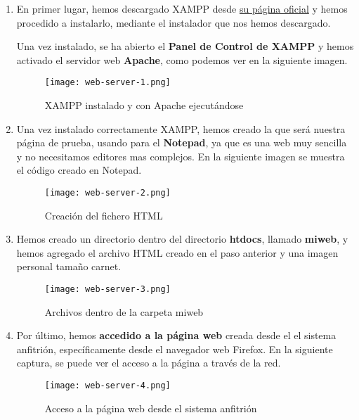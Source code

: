\begin{enumerate}
    \item En primer lugar, hemos descargado XAMPP desde \href{https://www.apachefriends.org/es/index.html}{su página oficial} y hemos procedido a instalarlo, mediante el instalador que nos hemos descargado.

    Una vez instalado, se ha abierto el \textbf{Panel de Control de XAMPP} y hemos activado el servidor web \textbf{Apache}, como podemos ver en la siguiente imagen.

    \begin{figure}[H]
        \centering
        \texttt{[image: web-server-1.png]}
        \caption{XAMPP instalado y con Apache ejecutándose}
    \end{figure}

    \item Una vez instalado correctamente XAMPP, hemos creado la que será nuestra página de prueba, usando para el \textbf{Notepad}, ya que es una web muy sencilla y no necesitamos editores mas complejos. En la siguiente imagen se muestra el código creado en Notepad.

    \begin{figure}[H]
        \centering
        \texttt{[image: web-server-2.png]}
        \caption{Creación del fichero HTML}
    \end{figure}

    \item Hemos creado un directorio dentro del directorio \textbf{htdocs}, llamado \textbf{miweb}, y hemos agregado el archivo HTML creado en el paso anterior y una imagen personal tamaño carnet.

    \begin{figure}[H]
        \centering
        \texttt{[image: web-server-3.png]}
        \caption{Archivos dentro de la carpeta miweb}
    \end{figure}

    \item Por último, hemos\textbf{ accedido a la página web} creada desde el el sistema anfitrión, específicamente desde el navegador web Firefox. En la siguiente captura, se puede ver el acceso a la página a través de la red.

    \begin{figure}[H]
        \centering
        \texttt{[image: web-server-4.png]}
        \caption{Acceso a la página web desde el sistema anfitrión}
    \end{figure}
\end{enumerate}

